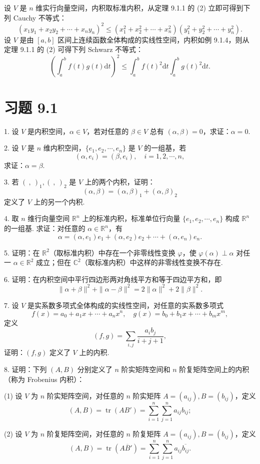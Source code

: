 \documentclass[UTF8,12pt,a4paper,fontset=fandol]{ctexart}
\begin{document}
设 $V$ 是 $n$ 维实行向量空间，内积取标准内积，从定理 9.1.1 的 (2) 立即可得到下列 Cauchy 不等式：
\[
  (x_1y_1+x_2y_2+\cdots+x_ny_n)^2
  \le
  (x_1^2+x_2^2+\cdots+x_n^2)(y_1^2+y_2^2+\cdots+y_n^2).
\]
设 $V$ 是由 $[a,b]$ 区间上连续函数全体构成的实线性空间，内积如例 9.1.4，则从定理 9.1.1 的 (2) 可得下列 Schwarz 不等式：
\[
  \left(\int_a^b f(t)g(t)\mathrm dt\right)^2
  \le
  \int_a^b f(t)^2\mathrm dt\int_a^b g(t)^2\mathrm dt.
\]

\section*{习题 9.1}

1. 设 $V$ 是内积空间，$\alpha\in V$，若对任意的 $\beta\in V$ 总有 $(\alpha,\beta)=0$，求证：$\alpha=0$.

2. 设 $V$ 是 $n$ 维内积空间，$\{e_1,e_2,\cdots,e_n\}$ 是 $V$ 的一组基，若
\[
  (\alpha,e_i)=(\beta,e_i),\quad i=1,2,\cdots,n,
\]
求证：$\alpha=\beta$.

3. 若 $(\ ,\ )_1,(\ ,\ )_2$ 是 $V$ 上的两个内积，证明：
\[
  (\alpha,\beta)=(\alpha,\beta)_1+(\alpha,\beta)_2
\]
定义了 $V$ 上的另一个内积.

4. 取 $n$ 维行向量空间 $\mathbb R^n$ 上的标准内积，标准单位行向量 $\{e_1,e_2,\cdots,e_n\}$ 构成 $\mathbb R^n$ 的一组基. 求证：对任意的 $\alpha\in\mathbb R^n$，有
\[
  \alpha=(\alpha,e_1)e_1+(\alpha,e_2)e_2+\cdots+(\alpha,e_n)e_n.
\]

5. 证明：在 $\mathbb R^2$（取标准内积）中存在一个非零线性变换 $\varphi$，使 $\varphi(\alpha)\perp\alpha$ 对任一 $\alpha\in\mathbb R^2$ 成立；但在 $\mathbb C^2$（取标准内积）中这样的非零线性变换不存在.

6. 证明：在内积空间中平行四边形两对角线平方和等于四边平方和，即
\[
  \|\alpha+\beta\|^2+\|\alpha-\beta\|^2=2\|\alpha\|^2+2\|\beta\|^2.
\]

7. 设 $V$ 是实系数多项式全体构成的实线性空间，对任意的实系数多项式
\[
  f(x)=a_0+a_1x+\cdots+a_nx^n,\quad
  g(x)=b_0+b_1x+\cdots+b_mx^m,
\]
定义
\[
  (f,g)=\sum_{i,j}\frac{a_ib_j}{i+j+1},
\]
证明：$(f,g)$ 定义了 $V$ 上的内积.

8. 证明：下列 $(A,B)$ 分别定义了 $n$ 阶实矩阵空间和 $n$ 阶复矩阵空间上的内积（称为 Frobenius 内积）：

(1) 设 $V$ 为 $n$ 阶实矩阵空间，对任意的 $n$ 阶实矩阵 $A=(a_{ij}),B=(b_{ij})$，定义
\[
  (A,B)=\operatorname{tr}(AB')=\sum_{i=1}^n\sum_{j=1}^n a_{ij}b_{ij};
\]

(2) 设 $V$ 为 $n$ 阶复矩阵空间，对任意的 $n$ 阶复矩阵 $A=(a_{ij}),B=(b_{ij})$，定义
\[
  (A,B)=\operatorname{tr}(A\overline B')=\sum_{i=1}^n\sum_{j=1}^n a_{ij}\overline{b_{ij}}.
\]
\end{document}
